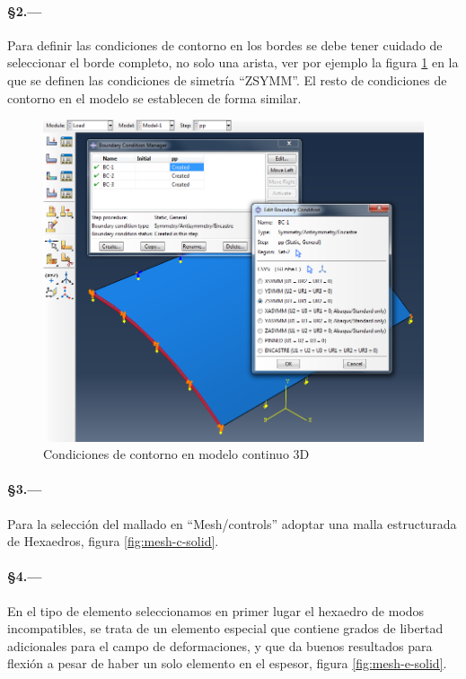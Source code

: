 \documentclass[spanish,a4paper,12pt]{article}
\begin{document}
\paragraph{\S2.---}
Para definir las condiciones de contorno en los bordes se debe tener cuidado de seleccionar el borde completo, no solo una arista, ver por ejemplo la figura \ref{fig:load-solid} en la que se definen las condiciones de simetría ``ZSYMM''.
El resto de condiciones de contorno en el modelo se establecen de forma similar.
\begin{figure}[h!tp]
\centering
\includegraphics[scale=0.3]{capturas/41-load-solid.png}
\caption{Condiciones de contorno en modelo continuo 3D}
\label{fig:load-solid}
\end{figure}
\paragraph{\S3.---}
Para la selección del mallado en ``Mesh/controls'' adoptar una malla estructurada de Hexaedros, 
figura \ref{fig:mesh-c-solid}.
\paragraph{\S4.---}
En el tipo de elemento seleccionamos en primer lugar el hexaedro de modos incompatibles, se trata de un elemento especial que contiene grados de libertad adicionales para el campo de deformaciones, y que da buenos resultados para flexión a pesar de haber un solo elemento en el espesor,
figura \ref{fig:mesh-e-solid}.
\end{document}
